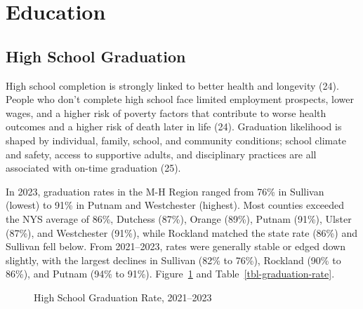 \documentclass[
  english,
  letterpaper,
]{report}
\begin{document}
\section{Education}\label{education}

\subsection{High School Graduation}\label{high-school-graduation}

High school completion is strongly linked to better health and longevity
(24). People who don't complete high school face limited employment
prospects, lower wages, and a higher risk of poverty factors that
contribute to worse health outcomes and a higher risk of death later in
life (24). Graduation likelihood is shaped by individual, family,
school, and community conditions; school climate and safety, access to
supportive adults, and disciplinary practices are all associated with
on-time graduation (25).

In 2023, graduation rates in the M-H Region ranged from 76\% in Sullivan
(lowest) to 91\% in Putnam and Westchester (highest). Most counties
exceeded the NYS average of 86\%, Dutchess (87\%), Orange (89\%), Putnam
(91\%), Ulster (87\%), and Westchester (91\%), while Rockland matched
the state rate (86\%) and Sullivan fell below. From 2021--2023, rates
were generally stable or edged down slightly, with the largest declines
in Sullivan (82\% to 76\%), Rockland (90\% to 86\%), and Putnam (94\% to
91\%). Figure~\ref{fig-graduation-rate} and
Table~\ref{tbl-graduation-rate}.

\begin{figure}


\caption{\label{fig-graduation-rate}High School Graduation Rate,
2021--2023}

\end{figure}%
\end{document}
